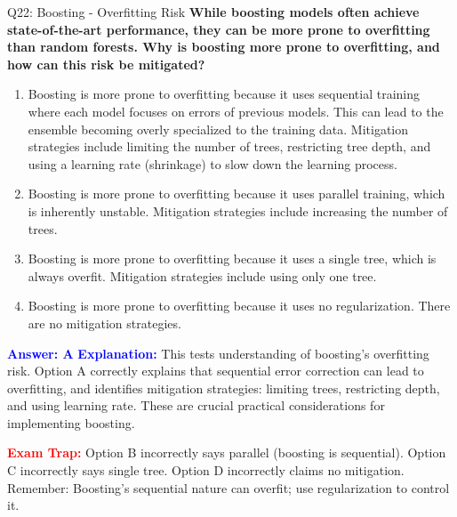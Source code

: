 \documentclass[8pt]{beamer}
\begin{document}
	\begin{frame}{Q22: Boosting - Overfitting Risk}
		\fontsize{6.5}{7.5}\selectfont
		\textbf{While boosting models often achieve state-of-the-art performance, they can be more prone to overfitting than random forests. Why is boosting more prone to overfitting, and how can this risk be mitigated?}
		
		\begin{enumerate}
			\item Boosting is more prone to overfitting because it uses sequential training where each model focuses on errors of previous models. This can lead to the ensemble becoming overly specialized to the training data. Mitigation strategies include limiting the number of trees, restricting tree depth, and using a learning rate (shrinkage) to slow down the learning process.
			\item Boosting is more prone to overfitting because it uses parallel training, which is inherently unstable. Mitigation strategies include increasing the number of trees.
			\item Boosting is more prone to overfitting because it uses a single tree, which is always overfit. Mitigation strategies include using only one tree.
			\item Boosting is more prone to overfitting because it uses no regularization. There are no mitigation strategies.
		\end{enumerate}
		
		\vspace{0.1cm}
		\textcolor{blue}{\textbf{Answer: A}}
		\vspace{0.1cm}
		\textcolor{blue}{\textbf{Explanation:}} This tests understanding of boosting's overfitting risk. Option A correctly explains that sequential error correction can lead to overfitting, and identifies mitigation strategies: limiting trees, restricting depth, and using learning rate. These are crucial practical considerations for implementing boosting.
		
		\textcolor{red}{\textbf{Exam Trap:}} Option B incorrectly says parallel (boosting is sequential). Option C incorrectly says single tree. Option D incorrectly claims no mitigation. Remember: Boosting's sequential nature can overfit; use regularization to control it.
	\end{frame}
	
\end{document}
